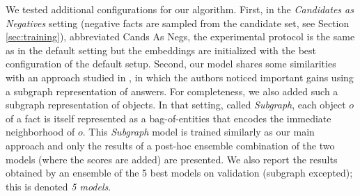 \documentclass[11pt,a4paper]{article}
\newcommand{\obj}{o}
\begin{document}
We tested additional configurations for our algorithm. First, in the
{\it Candidates as Negatives} setting (negative facts are sampled from
the candidate set, see Section \ref{sec:training}), abbreviated {\sc
  Cands As Negs}, the experimental protocol is the same as in the
default setting but the embeddings are initialized with the best
configuration of the default setup. Second, our model shares some
similarities with an approach studied in
\cite{bordes-chopra-weston:2014:EMNLP2014}, in which the authors
noticed important gains using a subgraph representation of
answers. For completeness, we also added such a subgraph
representation of objects. In that setting, called {\it Subgraph},
each object $\obj$ of a fact is itself represented as a
bag-of-entities that encodes the immediate neighborhood of
$o$. This {\it Subgraph} model is trained similarly as our main
approach and only the results of a post-hoc ensemble combination of the two
models (where the scores are added) are presented.
We also report the results obtained by an ensemble of the 5 best models
on validation (subgraph excepted); this is denoted {\it 5 models}.
\end{document}
